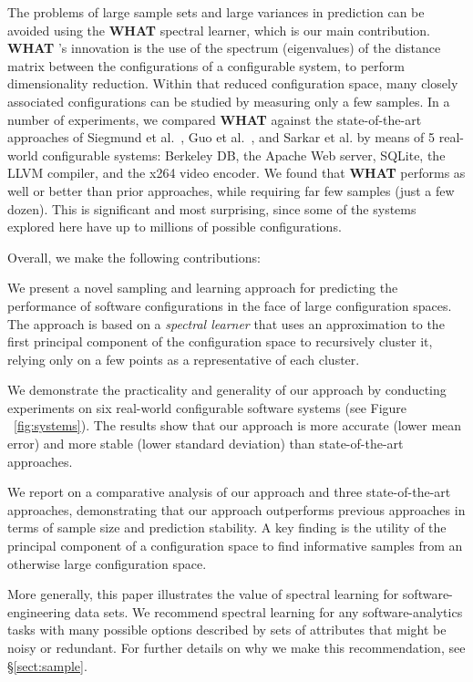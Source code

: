 \documentclass{newsig}
\newcommand{\tion}[1]{\S\ref{sect:#1}}
\newcommand{\what}{{\bf WHAT }}
\begin{document}
The problems of large sample sets and large variances in prediction can be avoided using the \what spectral learner, which is our main contribution.  
{\what}'s innovation is  the use of the spectrum (eigenvalues) of the distance matrix
between the configurations of a configurable system, to perform dimensionality reduction. Within that
reduced configuration space, many closely associated configurations can be studied
by measuring only a few samples.
In a number of experiments, we compared \what against the state-of-the-art approaches of Siegmund et al.~\cite{siegmund2012predicting}, Guo et al.~\cite{guo2013variability}, and Sarkar et al. \cite{sarkar2015cost} by means of 5 real-world configurable systems: Berkeley DB,  the Apache Web server, SQLite, the LLVM compiler, and the x264 video encoder.
We found that \what performs as well or better than prior approaches,
while  requiring far few samples (just a few dozen).
This is significant and most surprising, since some of the systems explored here have up to millions of possible configurations. 

Overall, we make the following contributions:
\begin{compactitem}
\item We present a novel sampling and learning approach for predicting the performance of software configurations in the face of large configuration spaces. The approach is based on a
{\em spectral
learner} that uses an approximation to the first principal component of the configuration space to recursively cluster it, relying only on a few points as a representative of each cluster.
\item We demonstrate the practicality and generality of our approach by conducting experiments on six real-world configurable software systems (see Figure ~\ref{fig:systems}). The results show that our approach is more accurate (lower mean error) and more stable (lower standard deviation) than state-of-the-art approaches.
\item We report on a comparative analysis of our approach and three state-of-the-art approaches, demonstrating that our approach outperforms previous approaches in terms of sample size and prediction stability. A key finding is the utility of the principal component of a configuration space to  find informative samples from an otherwise large configuration space.
\end{compactitem}
More generally, this paper illustrates the value of spectral learning for software-engineering data sets. We recommend spectral learning for any software-analytics
tasks with many possible options described by sets of attributes
that might be noisy or redundant. For further details on why we make this recommendation, see \tion{sample}.
\end{document}
